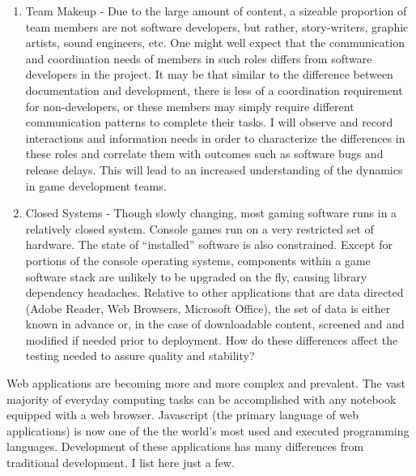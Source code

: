 \documentclass[10pt]{article}
\begin{document}
\begin{small}
\begin{enumerate}
\item Team Makeup - Due to the large amount of content, a sizeable proportion of team members
    are not software developers, but rather, story-writers, graphic artists, sound engineers,
    etc.  One might well expect that the communication and coordination needs of members
    in such roles differs from software developers in the project.  It may be that similar
    to the difference between documentation and development, there is less of a coordination
    requirement for non-developers, or these members may simply require different communication
    patterns to complete their tasks.  I will observe and record
    interactions and information needs in order to characterize the differences in these roles
    and correlate them with outcomes such as software bugs and release delays.  This will lead
    to an increased understanding of the dynamics in game development teams.

\item Closed Systems - Though slowly changing, most gaming software runs in a relatively closed
    system.  Console games run on a very restricted set of hardware.  The state of ``installed''
    software is also constrained.  Except for portions of the console operating systems, 
    components within a game software stack are unlikely to be upgraded on the fly, causing
    library dependency headaches.  Relative to other applications that are data directed (Adobe
    Reader, Web Browsers, Microsoft Office), the set of data is either known in advance or,
    in the case of downloadable content, screened and and modified if needed prior to deployment.
    How do these differences affect the testing needed to assure quality and stability?  

\end{enumerate}

Web applications are becoming more and more complex and prevalent.  The vast
majority of everyday computing tasks can be accomplished with any notebook
equipped with a web browser.  Javascript (the primary language of web
applications) is now one of the the world's most used and executed programming
languages.  Development of these applications has many differences from
traditional development.  I list here just a few.

\begin{enumerate}


\end{enumerate}
\end{small}
\end{document}

